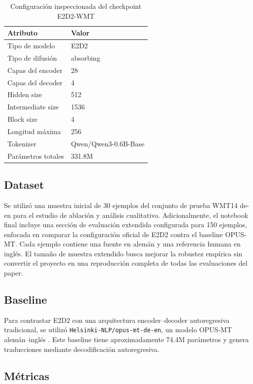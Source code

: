\documentclass[conference]{IEEEtran}
\begin{document}
\begin{table}[htbp]
\caption{Configuración inspeccionada del checkpoint E2D2-WMT}
\label{tab:arquitectura}
\centering
\begin{tabular}{ll}
\toprule
\textbf{Atributo} & \textbf{Valor} \\
\midrule
Tipo de modelo & E2D2 \\
Tipo de difusión & absorbing \\
Capas del encoder & 28 \\
Capas del decoder & 4 \\
Hidden size & 512 \\
Intermediate size & 1536 \\
Block size & 4 \\
Longitud máxima & 256 \\
Tokenizer & Qwen/Qwen3-0.6B-Base \\
Parámetros totales & 331.8M \\
\bottomrule
\end{tabular}
\end{table}

\subsection{Dataset}

Se utilizó una muestra inicial de 30 ejemplos del conjunto de prueba WMT14 de-en para el estudio de ablación y análisis cualitativo. Adicionalmente, el notebook final incluye una sección de evaluación extendida configurada para 150 ejemplos, enfocada en comparar la configuración oficial de E2D2 contra el baseline OPUS-MT. Cada ejemplo contiene una fuente en alemán y una referencia humana en inglés. El tamaño de muestra extendido busca mejorar la robustez empírica sin convertir el proyecto en una reproducción completa de todas las evaluaciones del paper.

\subsection{Baseline}

Para contrastar E2D2 con una arquitectura encoder--decoder autoregresiva tradicional, se utilizó \texttt{Helsinki-NLP/opus-mt-de-en}, un modelo OPUS-MT alemán--inglés \cite{tiedemann2020opusmt}. Este baseline tiene aproximadamente 74.4M parámetros y genera traducciones mediante decodificación autoregresiva.

\subsection{Métricas}
\end{document}
